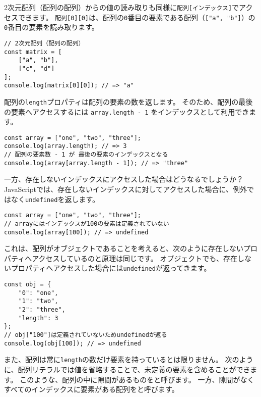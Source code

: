 2次元配列（配列の配列）からの値の読み取りも同様に\texttt{配列[インデックス]}でアクセスできます。
\texttt{配列[0][0]}は、配列の\texttt{0}番目の要素である配列（\texttt{["a", "b"]}）の\texttt{0}番目の要素を読み取ります。

\begin{lstlisting}
// 2次元配列（配列の配列）
const matrix = [
    ["a", "b"],
    ["c", "d"]
];
console.log(matrix[0][0]); // => "a"
\end{lstlisting}

配列の\texttt{length}プロパティは配列の要素の数を返します。
そのため、配列の最後の要素へアクセスするには
\texttt{array.length - 1}
をインデックスとして利用できます。

\begin{lstlisting}
const array = ["one", "two", "three"];
console.log(array.length); // => 3
// 配列の要素数 - 1 が 最後の要素のインデックスとなる
console.log(array[array.length - 1]); // => "three"
\end{lstlisting}

一方、存在しないインデックスにアクセスした場合はどうなるでしょうか？　JavaScriptでは、存在しないインデックスに対してアクセスした場合に、例外ではなく\texttt{undefined}を返します。

\begin{lstlisting}
const array = ["one", "two", "three"];
// arrayにはインデックスが100の要素は定義されていない
console.log(array[100]); // => undefined
\end{lstlisting}

これは、配列がオブジェクトであることを考えると、次のように存在しないプロパティへアクセスしているのと原理は同じです。
オブジェクトでも、存在しないプロパティへアクセスした場合には\texttt{undefined}が返ってきます。

\begin{lstlisting}
const obj = {
    "0": "one",
    "1": "two",
    "2": "three",
    "length": 3
};
// obj["100"]は定義されていないためundefinedが返る
console.log(obj[100]); // => undefined
\end{lstlisting}

また、配列は常に\texttt{length}の数だけ要素を持っているとは限りません。
次のように、配列リテラルでは値を省略することで、未定義の要素を含めることができます。
このような、配列の中に隙間があるものを\textbf{}と呼びます。
一方、隙間がなくすべてのインデックスに要素がある配列を\textbf{}と呼びます。

